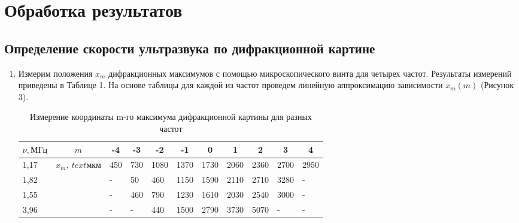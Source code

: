 \documentclass{article}
\begin{document}
\section{Обработка результатов}
\subsection{Определение скорости ультразвука по дифракционной картине}
\begin{enumerate}

  \item  Измерим положения $ x_m $ дифракционных максимумов с помощью микроскопического винта для четырех частот. Результаты измерений приведены в Таблице 1. На основе таблицы для каждой из частот проведем линейную аппроксимацию зависимости $ x_m (m) $ (Рисунок 3). 

\begin{table}[h!]
\centering
\begin{tabular}{|l|c|l|l|l|l|l|l|l|l|l|}
\hline
$\nu, \text{МГц}$ & \textbf{$m$} & \multicolumn{1}{c|}{\textbf{-4}} & \multicolumn{1}{c|}{\textbf{-3}} & \multicolumn{1}{c|}{-2}   & \multicolumn{1}{c|}{-1}   & \multicolumn{1}{c|}{0}    & \multicolumn{1}{c|}{1}    & \multicolumn{1}{c|}{2}    & \multicolumn{1}{c|}{3}    & \multicolumn{1}{c|}{4}    \\ \hline
1,17              & $x_m, \
text{мкм}$ & \multicolumn{1}{c|}{450}         & \multicolumn{1}{c|}{730}         & \multicolumn{1}{c|}{1080} & \multicolumn{1}{c|}{1370} & \multicolumn{1}{c|}{1730} & \multicolumn{1}{c|}{2060} & \multicolumn{1}{c|}{2360} & \multicolumn{1}{c|}{2700} & \multicolumn{1}{c|}{2950} \\ \cline{1-1} \cline{3-11} 
1,82              &              & -                                & 50                               & 460                       & 1150                      & 1590                      & 2110                      & 2710                      & 3280                      & -                         \\ \cline{1-1} \cline{3-11} 
1,55              &              & -                                & 460                              & 790                       & 1230                      & 1610                      & 2030                      & 2540                      & 3000                      & -                         \\ \cline{1-1} \cline{3-11} 
3,96              &              & -                                & -                                & 440                       & 1500                      & 2790                      & 3730                      & 5070                      & -                         & -                         \\ \hline
\end{tabular}
\caption{Измерение координаты m-го максимума дифракционной картины для разных частот}
\label{tab:my-table}
\end{table}



\end{enumerate}
\end{document}
